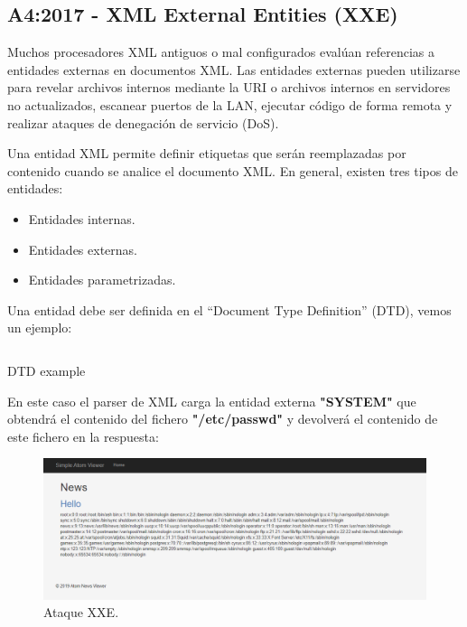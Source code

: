 \subsection{A4:2017 - XML External Entities (XXE)}

Muchos procesadores XML antiguos o mal configurados evalúan referencias a entidades externas en 
documentos XML. Las entidades externas pueden utilizarse para revelar archivos internos mediante la URI 
o archivos internos en servidores no actualizados, escanear puertos de la LAN, ejecutar código de forma
 remota y realizar ataques de denegación de servicio (DoS).

Una entidad XML permite definir etiquetas que serán reemplazadas por contenido cuando se analice 
el documento XML. En general, existen tres tipos de entidades: 

\begin{itemize}
    \item Entidades internas.
    \item Entidades externas.
    \item Entidades parametrizadas.
\end{itemize}

Una entidad debe ser definida en el “Document Type Definition” (DTD), vemos un ejemplo:

\begin{listing}[!htb]
    \inputminted{xml}{./Ficheros/DTD_example.xml}
    \caption{DTD example}
    \label{listing:1}
\end{listing}

En este caso el \gls{parser} de XML carga la entidad externa \textbf{"SYSTEM"} que obtendrá el contenido del 
fichero \textbf{"/etc/passwd"} y devolverá el contenido de este fichero en la respuesta:

\begin{figure}[!htb]  
    \centering
    \captionsetup{width=1\linewidth}  
    \includegraphics[width=\linewidth]{./imagenes/015_XXE_Attack_1.png}
    \caption{Ataque XXE.}  
    \label{fig:6 - XXE attack}
\end{figure}

